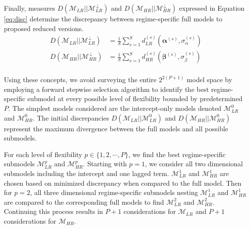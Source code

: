 Finally, measures $D(\mathcal{M}_{LR}||\mathcal{M}^\perp_{LR})$ and $D(\mathcal{M}_{HR}||\mathcal{M}^\perp_{HR})$ expressed in Equation \ref{eq:disc} determine the discrepancy between regime-specific full models to proposed reduced versions. 
\begin{equation}
\label{eq:disc}
\begin{split}
D(\mathcal{M}_{LR}||\mathcal{M}^\perp_{LR})&=\frac{1}{S}\sum\limits^S_{s=1} d^{(s)}_{LR}(\bm{\alpha}^{(s)},\sigma^{(s)}_\alpha)    \\
D(\mathcal{M}_{HR}||\mathcal{M}^\perp_{HR})&=\frac{1}{S}\sum\limits^S_{s=1} d^{(s)}_{HR}(\bm{\beta}^{(s)},\sigma^{(s)}_\beta)     \\
\end{split}
\end{equation}

Using these concepts, we avoid surveying the entire  $2^{2(P+1)}$ model space by employing a forward stepwise selection algorithm to identify the best regime-specific submodel at every possible level of flexibility bounded by predetermined $P$. The simplest models considered are the intercept-only models denoted $\mathcal{M}^0_{LR}$ and $\mathcal{M}^0_{HR}$. The initial discrepancies  $D(\mathcal{M}_{LR}||\mathcal{M}^0_{LR})$ and $D(\mathcal{M}_{HR}||\mathcal{M}^0_{HR})$ represent the maximum divergence between the full models and all possible submodels. 

For each level of flexibility $p \in \{1,2,\cdots,P\}$, we find the best regime-specific submodels $\mathcal{M}^p_{LR}$ and $\mathcal{M}^p_{HR}$. Starting with $p=1$, we consider all two dimensional submodels including the intercept and one lagged term. $\mathcal{M}^1_{LR}$ and $\mathcal{M}^1_{HR}$ are chosen based on minimized discrepancy when compared to the full model. Then for $p=2$, all three dimensional regime-specific submodels nesting $\mathcal{M}^1_{LR}$ and $\mathcal{M}^1_{HR}$ are compared to the corresponding full models to find $\mathcal{M}^2_{LR}$ and $\mathcal{M}^2_{HR}$. Continuing this process results in $P+1$ considerations for $\mathcal{M}_{LR}$ and $P+1$ considerations for $\mathcal{M}_{HR}$. 

